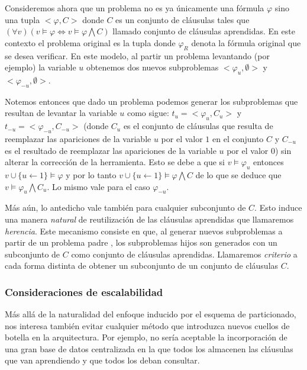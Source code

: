 Consideremos ahora que un problema no es ya únicamente una fórmula $\varphi$
sino una tupla $<\varphi, C>$ donde $C$ es un conjunto de cláusulas tales que
$(\forall v) (v \models \varphi \Longleftrightarrow v \models \varphi
\bigwedge C)$ llamado conjunto de cláusulas aprendidas. En este contexto el
problema original es la tupla \roottask donde $\varphi_R$ denota la fórmula
original que se desea verificar. En este modelo, al partir un problema \task
levantando (por ejemplo) la variable $u$ obtenemos dos nuevos subproblemas
$<\varphi_u, \emptyset>$ y $<\varphi_{-u}, \emptyset>$. 

Notemos entonces que dado un problema \nonemptytask podemos generar los
subproblemas que resultan de levantar la variable $u$ como sigue:
$t_u=<\varphi_u, C_u>$ y $t_{-u}=<\varphi_{-u}, C_{-u}>$ (donde $C_u$ es el
conjunto de cláusulas que resulta de reemplazar las apariciones de la variable
$u$ por el valor $1$ en el conjunto $C$ y $C_{-u}$ es el resultado de
reemplazar las apariciones de la variable $u$ por el valor $0$) sin alterar la
corrección de la herramienta. Esto se debe a que si $v \models \varphi_u$
entonces $v\cup\{u\leftarrow1\} \models \varphi$ y por lo tanto
$v\cup\{u\leftarrow1\} \models \varphi \bigwedge C$ de lo que se deduce que $v
\models \varphi_u \bigwedge C_u$. Lo mismo vale para el caso $\varphi_{-u}$.

Más aún, lo antedicho vale también para cualquier subconjunto de $C$. Esto
induce una manera \emph{natural} de reutilización de las cláusulas aprendidas
que llamaremos \emph{herencia}. Este mecanismo consiste en que, al generar
nuevos subproblemas a partir de un problema padre \nonemptytask, los
subproblemas hijos son generados con un subconjunto de $C$ como conjunto de
cláusulas aprendidas. Llamaremos \emph{criterio} a cada forma distinta de
obtener un subconjunto de un conjunto de cláusulas $C$.


\subsubsection{Consideraciones de escalabilidad}

Más allá de la naturalidad del enfoque inducido por el esquema de
particionado, nos interesa también evitar cualquier método que introduzca
nuevos cuellos de botella en la arquitectura. Por ejemplo, no sería aceptable
la incorporación de una gran base de datos centralizada en la que todos los
\ws almacenen las cláusulas que van aprendiendo y que todos los \ws deban
consultar.


